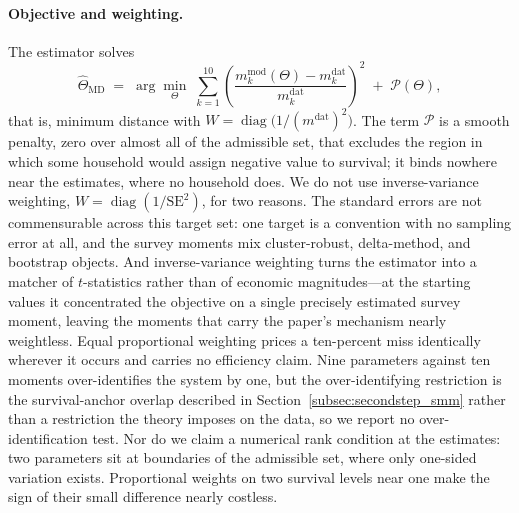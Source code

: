 \documentclass[12pt,a4paper]{article}
\begin{document}
\begin{appendices}
\paragraph{Objective and weighting.} The estimator solves
\begin{equation}
\label{eq:smm_objective}
\widehat\Theta_{\mathrm{MD}} \;=\; \arg\min_{\Theta}\; \sum_{k=1}^{10} \left( \frac{m_k^{\mathrm{mod}}(\Theta) - m_k^{\mathrm{dat}}}{m_k^{\mathrm{dat}}} \right)^{2} \;+\; \mathcal{P}(\Theta),
\end{equation}
that is, minimum distance with $W=\operatorname{diag}\bigl(1/(m^{\mathrm{dat}})^2\bigr)$. The term $\mathcal{P}$ is a smooth penalty, zero over almost all of the admissible set, that excludes the region in which some household would assign negative value to survival; it binds nowhere near the estimates, where no household does. We do not use inverse-variance weighting, $W=\operatorname{diag}(1/\mathrm{SE}^2)$, for two reasons. The standard errors are not commensurable across this target set: one target is a convention with no sampling error at all, and the survey moments mix cluster-robust, delta-method, and bootstrap objects. And inverse-variance weighting turns the estimator into a matcher of $t$-statistics rather than of economic magnitudes---at the starting values it concentrated the objective on a single precisely estimated survey moment, leaving the moments that carry the paper's mechanism nearly weightless. Equal proportional weighting prices a ten-percent miss identically wherever it occurs and carries no efficiency claim. Nine parameters against ten moments over-identifies the system by one, but the over-identifying restriction is the survival-anchor overlap described in Section~\ref{subsec:secondstep_smm} rather than a restriction the theory imposes on the data, so we report no over-identification test. Nor do we claim a numerical rank condition at the estimates: two parameters sit at boundaries of the admissible set, where only one-sided variation exists. Proportional weights on two survival levels near one make the sign of their small difference nearly costless.


\end{appendices}
\end{document}
